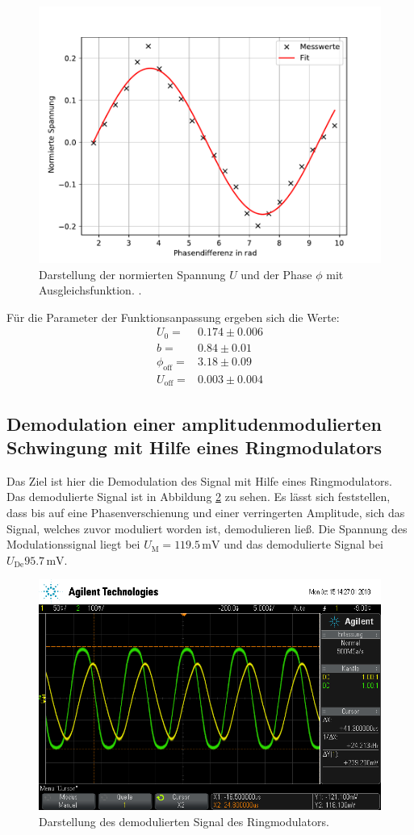 \begin{figure}
  \centering
  \includegraphics[width=0.7\linewidth]{build/plot.pdf}
  \caption{Darstellung der normierten Spannung $U$ und der Phase $\phi$ mit
  Ausgleichsfunktion.
  .}
  \label{fit1}
\end{figure}
Für die Parameter der Funktionsanpassung ergeben sich die Werte:
\begin{align}
U_0=&0.174 \pm 0.006\\
b=&0.84 \pm 0.01 \\
\phi_\text{off}=&3.18 \pm 0.09 \\
U_\text{off}=&0.003 \pm 0.004
\end{align}


\subsection{Demodulation einer amplitudenmodulierten Schwingung mit Hilfe eines
Ringmodulators}
Das Ziel ist hier die Demodulation des Signal mit Hilfe eines Ringmodulators.
Das demodulierte Signal ist in Abbildung \ref{gege} zu sehen. Es lässt
sich feststellen, dass bis auf eine Phasenverschienung und einer verringerten
Amplitude, sich das Signal, welches zuvor moduliert worden ist, demodulieren ließ. Die Spannung
des Modulationssignal liegt bei $U_\text{M}=119.5 \,\text{mV}$ und das demodulierte
Signal bei $U_\text{De}95.7\,\text{mV}$.

\begin{figure}
  \centering
  \includegraphics[width=0.7\linewidth]{ressources/scope_459.png}
  \caption{Darstellung des demodulierten Signal des Ringmodulators.}
  \label{gege}
\end{figure}

